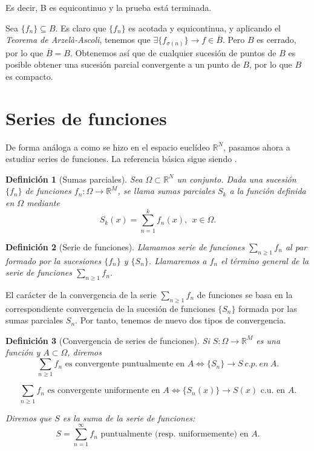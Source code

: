 \documentclass[11pt, a4paper]{article}
\makeatletter
\newif\IfInSansMode
\let\oldsf\sffamily
\renewcommand*{\sffamily}{\oldsf\mathversion{sans}\InSansModetrue}
\let\oldnorm\normalfont
\renewcommand*{\normalfont}{\oldnorm\InSansModefalse\mathversion{normal}}
\newcommand{\fn}{\{f_n\}}
\renewenvironment{proof}[1][\proofname] {\par\pushQED{\qed}\normalfont\topsep6\p@\@plus6\p@\relax\trivlist\item[\hskip\labelsep\itshape\sffamily#1\@addpunct{.}]\ignorespaces}{\popQED\endtrivlist\@endpefalse}
\theoremstyle{theorem-style}
\theoremstyle{definition-style}
\newtheorem{ndef}{Definición}[section]
\theoremstyle{remark-style}
\theoremstyle{example-style}
\makeatother
\begin{document}
\begin{proof}
    Es decir, B es equicontinuo y la prueba está terminada.

    \boxed{\Leftarrow} Sea $\fn \subseteq B$. Es claro que $\fn$ es acotada y equicontinua, y aplicando el \textit{Teorema de Arzelà-Ascoli}, tenemos que $\exists \{f_{\sigma(n)}\} \to f \in \overline{B}$. Pero $B$ es cerrado, por lo que $\overline{B} = B$. Obtenemos así que de cualquier sucesión de puntos de $B$ es posible obtener una sucesión parcial convergente a un punto de $B$, por lo que $B$ es compacto.
  \end{proof}

\newpage



\section{Series de funciones}

De forma análoga a como se hizo en el espacio euclídeo $\mathbb{R}^N$, pasamos ahora a estudiar series de funciones. La referencia básica sigue siendo \cite[Capítulo 5]{marsden}.

\begin{ndef}[Sumas parciales]
  Sea $\Omega\subset \mathbb R^N$ un conjunto. 
  Dada una sucesi\'on $\{f_n \}$ de funciones $f_n : \Omega \longrightarrow \mathbb R^M$, se llama sumas parciales $S_k$ a la funci\'on definida en $\Omega$ mediante
  \[ 
    S_k (x) = \sum_{n=1}^{k} f_n(x),\ \ x\in\Omega.
  \] 
\end{ndef}

\begin{ndef}[Serie de funciones]
  Llamamos serie  de funciones $\sum_{n\geq 1} f_n$ al par formado por la sucesiones  $\{ f_n \}$ y $\{S_n\}$. Llamaremos a $f_n$ el t\'ermino general de la serie de funciones $\displaystyle\sum_{n\geq 1} f_n$.
\end{ndef}


El car\'acter de la convergencia de la serie $\sum_{n\geq 1} f_n$ de funciones se basa en la correspondiente convergencia de la sucesi\'on de funciones $\{S_n\}$ formada por las sumas parciales $S_n$. Por tanto, tenemos de nuevo dos tipos de convergencia.
\begin{ndef}[Convergencia de series de funciones]
  Si $S:\Omega\longrightarrow \mathbb R^M$ es una funci\'on y $A\subset \Omega$, diremos 
  $$\sum_{n\geq 1} f_n  \mbox{ es convergente puntualmente en } A \Leftrightarrow \{S_n \} \longrightarrow S\ c.p.\ en\ A.$$

  $$\sum_{n\geq 1} f_n  \mbox{ es convergente uniformente en }A \Leftrightarrow \{S_n(x)\} \longrightarrow S(x) \mbox{ c.u. en }A.$$ 

  Diremos que $S$ es la suma de la serie de funciones: 
  \[
    S=\displaystyle \sum_{n=1}^{\infty} f_n \mbox{ puntualmente (resp. uniformemente) en $A$.}
  \]
\end{ndef}
\end{document}
